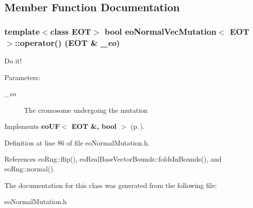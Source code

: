 \subsection{Member Function Documentation}
\subsubsection{\setlength{\rightskip}{0pt plus 5cm}template$<$class EOT$>$ bool {\bf eo\-Normal\-Vec\-Mutation}$<$ {\bf EOT} $>$::operator() ({\bf EOT} \& {\em \_\-eo})\hspace{0.3cm}{\tt  [inline, virtual]}}\label{classeo_normal_vec_mutation_a3}


Do it! 

\begin{Desc}
\item[Parameters:]
\begin{description}
\item[{\em \_\-eo}]The cromosome undergoing the mutation \end{description}
\end{Desc}


Implements {\bf eo\-UF$<$ EOT \&, bool $>$} {\rm (p.\,\pageref{classeo_u_f_a1})}.

Definition at line 86 of file eo\-Normal\-Mutation.h.

References eo\-Rng::flip(), eo\-Real\-Base\-Vector\-Bounds::folds\-In\-Bounds(), and eo\-Rng::normal().

The documentation for this class was generated from the following file:\begin{CompactItemize}
\item 
eo\-Normal\-Mutation.h\end{CompactItemize}

